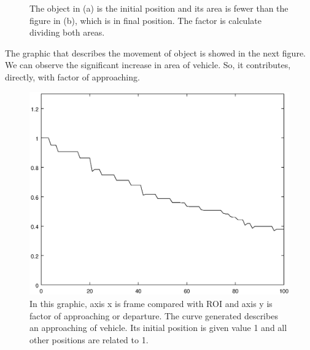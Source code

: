 \begin{figure}[H]
\centering
  \caption{The object in (a) is the initial position and its area is fewer than the figure in (b), which is in final position. 
  The factor is calculate dividing both areas.}
\end{figure}

The graphic that describes the movement of object is showed in the next figure. We can observe the significant increase in area of vehicle. So, it 
contributes, directly, with factor of approaching.

\begin{figure}[H]
\includegraphics[width=\columnwidth]{images/graph2.eps}
\caption{In this graphic, axis x is frame compared with ROI and axis y is factor of approaching or departure.
The curve generated describes an approaching of vehicle. Its initial position is given value 1 and all other positions are related to 1.}
\label{fig:res_graph2}
\end{figure}

